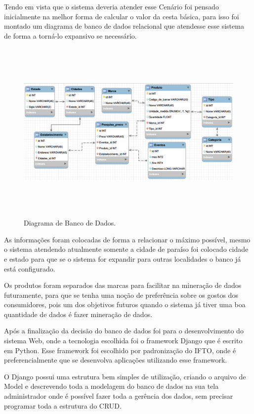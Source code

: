 \documentclass{ifto-tex}
\begin{document}
	Tendo em vista que o sistema deveria atender esse Cenário foi pensado inicialmente na melhor forma de calcular o valor da cesta básica, para isso foi montado um diagrama de banco de dados relacional que  atendesse esse sistema de forma a torná-lo expansivo se necessário.
	\begin{figure}[!h]
		\begin{center}
			\includegraphics[width=16.0cm, height= 9.0cm]{cestadiagrama.png}    %
			\caption{Diagrama de Banco de Dados.} 
			\label{fig:faces}
		\end{center}
	\end{figure}
As informações foram colocadas de forma a relacionar o máximo possível, mesmo o sistema atendendo atualmente somente a cidade de paraíso foi colocado cidade e estado para que se o sistema for expandir para outras localidades o banco já está configurado.

Os produtos foram separados das marcas para facilitar na mineração de dados futuramente, para que se tenha uma noção de preferência sobre os gostos dos consumidores, pois um dos objetivos futuros quando o sistema já tiver uma boa quantidade de dados é fazer mineração de dados.

Após a finalização da decisão do banco de dados foi para o desenvolvimento do sistema Web, onde a tecnologia escolhida foi o framework Django que é escrito em Python. Esse framework foi escolhido por padronização do IFTO, onde é preferencialmente que se desenvolva aplicações utilizando esse framework.

O Django possui uma estrutura bem simples de utilização, criando o arquivo de Model e descrevendo toda a modelagem do banco de dados na sua tela administrador onde é possível fazer toda a gerência dos dados, sem precisar programar toda a estrutura do CRUD.
\end{document}

